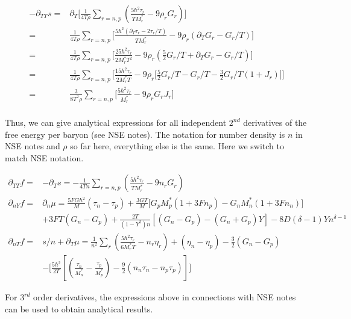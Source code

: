 \documentclass[preprint,prc,preprintnumbers,superscriptaddress,amsmath,amssymb,floatfix]{revtex4-1}
\begin{document}
\begin{equation}
\begin{split}
-\partial_{TT}s=&\partial_{T}\Big[\frac{1}{4T\rho}\sum_{r={n,p}}(\frac{5\hbar^2\tau_r}{T M_r^{*}}-9\rho_r G_r)\Big]\\
  =&\frac{1}{4T\rho}\sum_{r={n,p}}\big[\frac{5\hbar^2(\partial_T\tau_r-2\tau_r/T)}{TM_r^{*}}-9\rho_r (\partial_TG_r-G_r/T)\big]\\
  =&\frac{1}{4T\rho}\sum_{r={n,p}}\big[\frac{25\hbar^2\tau_r}{2M_r^{*}T^2}-9\rho_r (\frac{5}{2}G_r/T+\partial_TG_r-G_r/T)\big]\\
  =&\frac{1}{4T\rho}\sum_{r={n,p}}\big[\frac{15\hbar^2\tau_r}{2M_r^{*}T}-9\rho_r \big[\frac{5}{2}G_r/T-G_r/T-\frac{3}{2}G_r/T(1+J_r)]\big]\\
  =&\frac{3}{8T^2\rho}\sum_{r={n,p}}\big[\frac{5\hbar^2\tau_r}{M_r^{*}}-9\rho_rG_r J_r\big]\\
 \end{split}
\end{equation}

Thus, we can give analytical expressions for all independent $2^{nd}$ derivatives of the free energy per baryon (see NSE notes). The 
notation for number density is $n$ in NSE notes and $\rho$ so far here, everything else is the same. Here we switch to match NSE notation.

\begin{mdframed}
 \begin{equation}
  \begin{split}
   \partial_{TT}f=&-\partial_Ts=-\frac{1}{4Tn}\sum_{r={n,p}}(\frac{5\hbar^2\tau_r}{TM_r^{*}}-9n_r G_r)\\
   \partial_{nY}f=&\partial_n\mu=\frac{5 FG\hbar^2}{M}(\tau_n-\tau_p)+\frac{3GT}{M}\Big[G_p M^{*}_p (1+3Fn_p)-G_n M^{*}_n(1+3Fn_n)\Big]\\
  &+3FT(G_n-G_p)+\frac{2T}{(1-Y^2)n}[(G_n-G_p)-(G_n+G_p)Y]-8D(\delta-1)Yn^{\delta-1}\\
  \partial_{nT}f=& s/n+\partial_T\mu=\frac{1}{n^2}\sum_r(\frac{5\hbar^2 \tau_r}{6 M_r^{*}T}-n_r\eta_r)+(\eta_n-\eta_p)-\frac{3}{2}(G_n-G_p)\\
  &-\Big[\frac{5\hbar^2}{2T}[(\frac{\tau_n}{M_n^{*}}-\frac{\tau_p}{M_p^{*}})-\frac{9}{2}(n_n \tau_n-n_p \tau_p)]\Big]
  \end{split}
 \end{equation}
\end{mdframed}

For $3^{rd}$ order derivatives, the expressions above in connections with NSE notes can be used to obtain analytical results.
\end{document}
